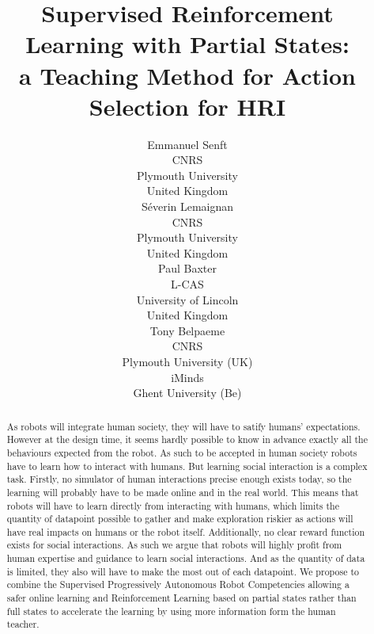 \documentclass[letterpaper]{article} %
\begin{document}
%
\title{Supervised Reinforcement Learning with Partial States: \\
 a Teaching Method for Action Selection for HRI}

\author{Emmanuel Senft \\
CNRS \\
Plymouth University \\
United Kingdom\\
\And S\'{e}verin Lemaignan\\
CNRS \\
Plymouth University \\
United Kingdom\\
\And Paul Baxter\\
L-CAS\\
University of Lincoln\\
United Kingdom\\
 \And Tony Belpaeme\\
 CNRS\\ Plymouth University (UK) \\ iMinds \\ Ghent University (Be)}

\maketitle
\begin{abstract}
As robots will integrate human society, they will have to satify humans'
expectations. However at the design time, it seems hardly possible to
know in advance exactly all the behaviours expected from the robot. As such to
be accepted in human society robots have to learn how to interact with humans.
But learning social interaction is a complex task. Firstly, no simulator of
human interactions precise enough exists today, so the learning will probably have
to be made online and in the real world.
This means that robots will have to learn directly from interacting with humans,
which limits the quantity of datapoint possible to gather and make exploration
riskier as actions will have real impacts on humans or the robot itself. Additionally,
no clear reward function exists for social interactions. As such we argue that
robots will highly profit from human expertise and guidance to learn social
interactions. And as the quantity of data is limited, they also will have to make the most out of each datapoint. We
propose to combine the Supervised Progressively Autonomous Robot Competencies
allowing a safer online learning and Reinforcement Learning based on partial
states rather than full states to accelerate the learning by using more
information form the human teacher.
\end{abstract}
\end{document}

